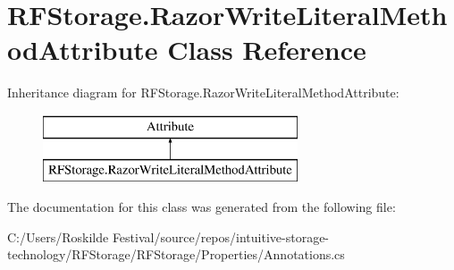 \section{R\+F\+Storage.\+Razor\+Write\+Literal\+Method\+Attribute Class Reference}
\label{class_r_f_storage_1_1_razor_write_literal_method_attribute}
Inheritance diagram for R\+F\+Storage.\+Razor\+Write\+Literal\+Method\+Attribute\+:\begin{figure}[H]
\begin{center}
\leavevmode
\includegraphics[height=2.000000cm]{class_r_f_storage_1_1_razor_write_literal_method_attribute}
\end{center}
\end{figure}


The documentation for this class was generated from the following file\+:\begin{DoxyCompactItemize}
\item 
C\+:/\+Users/\+Roskilde Festival/source/repos/intuitive-\/storage-\/technology/\+R\+F\+Storage/\+R\+F\+Storage/\+Properties/Annotations.\+cs\end{DoxyCompactItemize}

